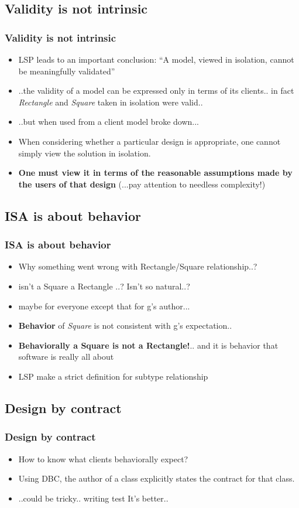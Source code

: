 \documentclass{beamer}
\begin{document}
\subsection{Validity is not intrinsic}
\begin{frame}
  \frametitle{Validity is not intrinsic}
  \begin{itemize}
	\item<+-> LSP leads to an important conclusion: ``A model, viewed in isolation, cannot be meaningfully validated''
	\item<+-> ..the validity of a model can be expressed only in terms of
its clients.. in fact \textit{Rectangle} and \textit{Square} taken in isolation were valid..
	\item<+-> ..but when used from a client model broke down...
	\item<+-> When considering whether a particular design is appropriate, one cannot simply view the solution in isolation.
	\item<+-> \textbf{One must view it in terms of the reasonable assumptions made by the users of that
design} (...pay attention to needless complexity!)
   \end{itemize}
\end{frame}

\subsection{ISA is about behavior}
\begin{frame}
  \frametitle{ISA is about behavior}
  \begin{itemize}
	\item<+-> Why something went wrong with Rectangle/Square relationship..? 
	\item<+-> isn't a Square a Rectangle ..? Isn't so natural..?
	\item<+-> maybe for everyone except that for g's author...
	\item<+-> \textbf{Behavior} of \textit{Square} is not consistent with g's expectation.. 
	\item<+-> \textbf{Behaviorally a Square is not a Rectangle!}.. and it is behavior that software is really all about
	\item<+-> LSP make a strict definition for subtype relationship
   \end{itemize}
\end{frame}

\subsection{Design by contract}
\begin{frame}
  \frametitle{Design by contract}
  \begin{itemize}
	\item<+-> How to know what clients behaviorally expect?
	\item<+-> Using DBC, the author of a class explicitly states the contract for that class.
	\item<+-> ..could be tricky.. writing test It's better..
   \end{itemize}
\end{frame}
\end{document}
